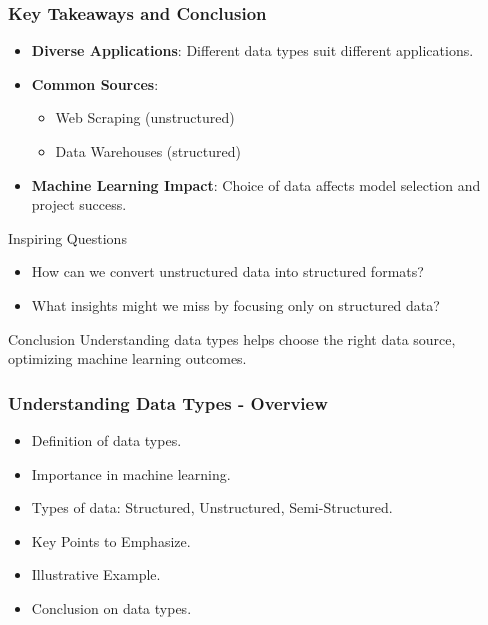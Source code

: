 \documentclass[aspectratio=169]{beamer}
\begin{document}
\begin{frame}[fragile]
    \frametitle{Key Takeaways and Conclusion}
    \begin{itemize}
        \item \textbf{Diverse Applications}: Different data types suit different applications.
        \item \textbf{Common Sources}:
          \begin{itemize}
              \item Web Scraping (unstructured)
              \item Data Warehouses (structured)
          \end{itemize}
        \item \textbf{Machine Learning Impact}: Choice of data affects model selection and project success.
    \end{itemize}
    
    \begin{block}{Inspiring Questions}
        \begin{itemize}
            \item How can we convert unstructured data into structured formats?
            \item What insights might we miss by focusing only on structured data?
        \end{itemize}
    \end{block}
    
    \begin{block}{Conclusion}
        Understanding data types helps choose the right data source, optimizing machine learning outcomes.
    \end{block}
\end{frame}

\begin{frame}[fragile]
    \frametitle{Understanding Data Types - Overview}
    \begin{itemize}
        \item Definition of data types.
        \item Importance in machine learning.
        \item Types of data: Structured, Unstructured, Semi-Structured.
        \item Key Points to Emphasize.
        \item Illustrative Example.
        \item Conclusion on data types.
    \end{itemize}
\end{frame}
\end{document}
